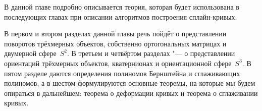 В данной главе подробно описывается теория, которая будет использована в последующих главах при описании алгоритмов
построения сплайн-кривых.

В первом и втором разделах данной главы речь пойдёт о представлении поворотов трёхмерных объектов, собственно
ортогональных матрицах и двумерной сфере~$S^2$. В третьем и четвёртом разделах "--- о представлении ориентаций
трёхмерных объектов, кватернионах и ориентационной сфере~$S^3$. В пятом разделе даются определения полиномов
Бернштейна и сглаживающих полиномов, а в шестом формулируются основные теоремы, на которые мы будем
опираться в дальнейшем: теорема о деформации кривых и теорема о сглаживании кривых.
